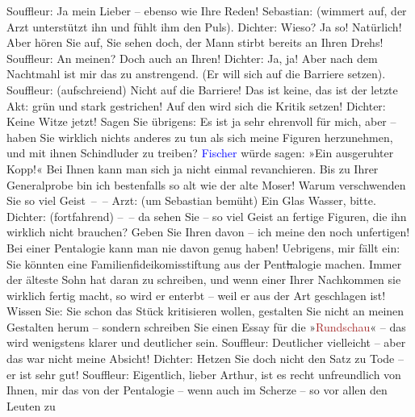 \documentclass[twoside=false,titlepage=false,open=any, parskip=never, fontsize=12pt, headings=small, chapterprefix=false, appendixprefix=false]{scrbook}
\newcommand{\strikeout}[1]{\sout{#1}}
\newcommand{\pbposition}{\depth}
\newcommand{\pb}{\nobreak\hspace{0pt}\raisebox{-0.1em}{\raisebox{\pbposition}{\textnormal{|}}}\nobreak\hspace{0pt}}
\begin{document}
           Souffleur: Ja mein Lieber – ebenso wie Ihre Reden!\pend
           \pstart
           Sebastian: (wimmert auf, der Arzt unterstützt ihn und fühlt ihm den Puls).\pend
           \pstart
           Dichter: Wieso? Ja so! Natürlich! Aber hören Sie auf, Sie sehen doch, der Mann
					stirbt bereits an Ihren Drehs!\pend
           \pstart
           Souffleur: An meinen? Doch auch an Ihren!\pend
           \pstart
           Dichter: Ja, ja! Aber nach dem Nachtmahl ist mir das zu anstrengend. (Er will
					sich auf die Barriere setzen).\pend
           \pstart
           Souffleur: (aufschreiend) Nicht auf die Barriere! Das ist keine, das ist der
					letzte Akt: grün und stark gestrichen! Auf den wird sich die Kritik setzen!\pend
           \pstart
           Dichter: Keine Witze jetzt! Sagen Sie übrigens: Es ist ja sehr ehrenvoll für
					mich, aber – haben Sie wirklich nichts anderes zu tun als sich meine Figuren
					herzunehmen, und mit ihnen Schindluder zu treiben? \textcolor{blue}{Fischer}{}\ledrightnote{\textcolor{blue}{Samuel Fischer}} würde sagen: »Ein ausgeruhter Kopp!« Bei Ihnen
					kann man sich ja nicht einmal revanchieren. Bis zu Ihrer Generalprobe bin ich
					bestenfalls so alt wie der alte Moser! Warum verschwenden Sie so viel
					Geist – –\pend
           \pstart
           Arzt: (um Sebastian bemüht) Ein Glas Wasser, bitte.\pend
           \pstart
           Dichter: (fortfahrend) – – da sehen Sie – so viel Geist an fertige Figuren,
					die ihn wirklich nicht brauchen? Geben Sie Ihren davon – ich meine den noch
					unfertigen! Bei einer Pentalogie kann man nie davon genug haben! Uebrigens, mir
					fällt ein: Sie könnten eine Familienfideikomisstiftung aus der Pent\strikeout{h}alogie machen. Immer der älteste Sohn hat daran
					zu schreiben, und wenn einer Ihrer Nachkommen sie wirklich fertig macht, so
						wird{ }{\pb}er enterbt – weil er aus der
					Art geschlagen ist! Wissen Sie:  Sie schon das
					Stück kritisieren wollen, gestalten Sie nicht an meinen Gestalten herum –
					sondern schreiben Sie einen Essay für die »\textcolor{brown}{Rundschau}{}\ledrightnote{\textcolor{brown}{Neue Rundschau, Neue Deutsche Rundschau, Freie Bühne}}« – das wird wenigstens klarer und deutlicher sein.\pend
           \pstart
           Souffleur: Deutlicher vielleicht – aber das war nicht meine Absicht!\pend
           \pstart
           Dichter: Hetzen Sie doch nicht den Satz zu Tode – er ist sehr gut!\pend
           \pstart
           Souffleur: Eigentlich, lieber Arthur, ist es recht unfreundlich von Ihnen, mir
					das von der Pentalogie – wenn auch im Scherze – so vor allen den Leuten zu
\end{document}
